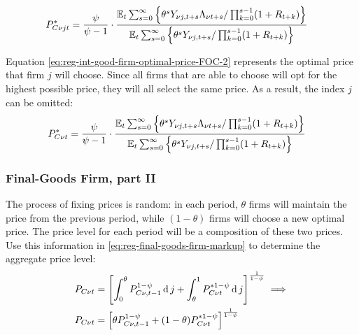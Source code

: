 \documentclass[
thesis.tex
]{subfiles}
\begin{document}
\vspace*{-1cm}

\begin{align}
	\label{eq:reg-int-good-firm-optimal-price-FOC-2}
	P_{C\nu jt}^\ast &= 
	\frac{\psi}{\psi-1} \cdot
	\frac{
		{\mathbb{E}_{t}} \sum_{s=0}^{\infty} \left\{ 
		\theta^s Y_{\nu j,t+s} \Lambda_{\nu t+s} / \prod_{k=0}^{s-1}(1+R_{t+k}) \right\} } {{\mathbb{E}_{t}} \sum_{s=0}^{\infty} \left\{
		\theta^s Y_{\nu j,t+s} / \prod_{k=0}^{s-1}(1+R_{t+k}) \right\}}
\end{align}


Equation \ref{eq:reg-int-good-firm-optimal-price-FOC-2} represents the optimal price that firm $j$ will choose. Since all firms that are able to choose will opt for the highest possible price, they will all select the same price. As a result, the index $j$ can be omitted:
\begin{align}
	\label{eq:reg-int-good-firm-optimal-price-FOC-3}
	P_{C\nu t}^\ast &= 
	\frac{\psi}{\psi-1} \cdot
	\frac{
		{\mathbb{E}_{t}} \sum_{s=0}^{\infty} \left\{ 
		\theta^s Y_{\nu j,t+s} \Lambda_{\nu t+s} / \prod_{k=0}^{s-1}(1+R_{t+k}) \right\} } {{\mathbb{E}_{t}} \sum_{s=0}^{\infty} \left\{
		\theta^s Y_{\nu j,t+s} / \prod_{k=0}^{s-1}(1+R_{t+k}) \right\}}
\end{align}


\subsubsection*{Final-Goods Firm, part II}

The process of fixing prices is random: in each period, $\theta$ firms will maintain the price from the previous period, while $(1-\theta)$ firms will choose a new optimal price. The price level for each period will be a composition of these two prices. Use this information in \ref{eq:reg-final-goods-firm-markup} to determine the aggregate price level:
\begin{align}
	P_{C\nu t} & = \left[ \int_{0}^{\theta} P_{C\nu, t-1}^{1-\psi} \operatorname{d} j + \int_{\theta}^{1} P_{C\nu t}^{\ast 1-\psi} \operatorname{d} j \right]^{\frac{1}{1-\psi}}  \implies \nonumber \\
	P_{C\nu t} & = \left[ \theta P_{C\nu, t-1}^{1-\psi} + (1-\theta) P_{C\nu t}^{\ast 1-\psi} \right]^\frac{1}{1-\psi} \label{eq:reg-general-price-level}
\end{align}
\end{document}
